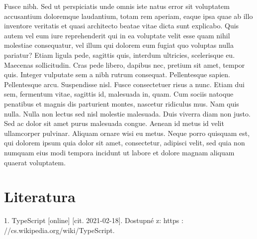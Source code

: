\documentclass[czech,master,dept460,male,cpp,cpdeclaration]{diploma}
\begin{document}
Fusce nibh. Sed ut perspiciatis unde omnis iste natus error sit voluptatem accusantium doloremque laudantium, totam rem aperiam, eaque ipsa quae ab illo inventore veritatis et quasi architecto beatae vitae dicta sunt explicabo. Quis autem vel eum iure reprehenderit qui in ea voluptate velit esse quam nihil molestiae consequatur, vel illum qui dolorem eum fugiat quo voluptas nulla pariatur? Etiam ligula pede, sagittis quis, interdum ultricies, scelerisque eu. Maecenas sollicitudin. Cras pede libero, dapibus nec, pretium sit amet, tempor quis. Integer vulputate sem a nibh rutrum consequat. Pellentesque sapien. Pellentesque arcu. Suspendisse nisl. Fusce consectetuer risus a nunc. Etiam dui sem, fermentum vitae, sagittis id, malesuada in, quam. Cum sociis natoque penatibus et magnis dis parturient montes, nascetur ridiculus mus. Nam quis nulla. Nulla non lectus sed nisl molestie malesuada. Duis viverra diam non justo. Sed ac dolor sit amet purus malesuada congue. Aenean id metus id velit ullamcorper pulvinar. Aliquam ornare wisi eu metus. Neque porro quisquam est, qui dolorem ipsum quia dolor sit amet, consectetur, adipisci velit, sed quia non numquam eius modi tempora incidunt ut labore et dolore magnam aliquam quaerat voluptatem.

\section{Literatura}
1. TypeScript [online] [cit. 2021-02-18]. Dostupné z: https : //cs.wikipedia.org/wiki/TypeScript.


\printbibliography[title={Literatura}, heading=bibintoc]
\end{document}
